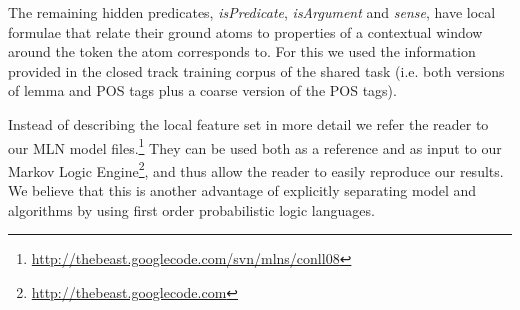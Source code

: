 The remaining hidden predicates, \emph{isPredicate}, \emph{isArgument} and \emph{sense}, have local formulae that relate their ground atoms to properties of a contextual window around the token the atom corresponds to. For this we used the information provided in the closed track training corpus of the shared task (i.e. both versions of lemma and POS tags plus a coarse version of the POS tags). 

Instead of describing the local feature set in more detail we refer the reader to our MLN model files.\footnote{\url{http://thebeast.googlecode.com/svn/mlns/conll08}} They can be used both as a reference and as input to our Markov Logic Engine\footnote{\url{http://thebeast.googlecode.com}}, and thus allow the reader to easily reproduce our results. We believe that this is another advantage of explicitly separating model and algorithms by using first order probabilistic logic languages.







 



